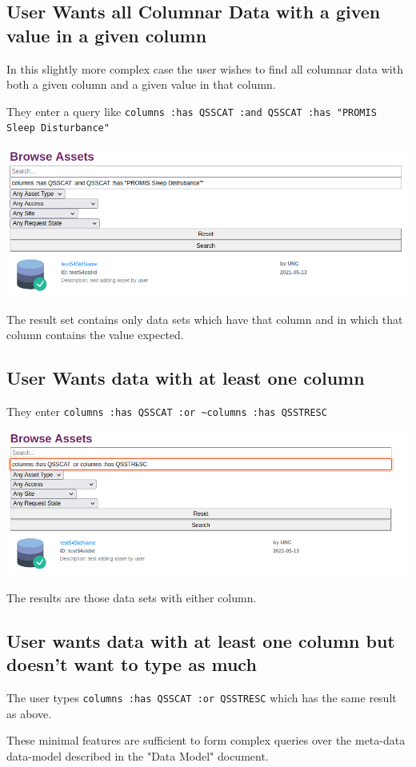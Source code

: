 \documentclass[11pt]{article}
\begin{document}
\subsection{User Wants all Columnar Data with a given value in a given column}
\label{sec:orge70e2aa}

In this slightly more complex case the user wishes to find all
columnar data with both a given column and a given value in that
column.

They enter a query like \texttt{columns :has QSSCAT :and QSSCAT :has "PROMIS
Sleep Disturbance"}

\begin{center}
\includegraphics[width=.9\linewidth]{./query2.png}
\end{center}

The result set contains only data sets which have that column and in
which that column contains the value expected.

\subsection{User Wants data with at least one column}
\label{sec:org95fb4a7}

They enter \texttt{columns :has QSSCAT :or \textasciitilde{}columns :has QSSTRESC}

\begin{center}
\includegraphics[width=.9\linewidth]{./query3.png}
\end{center}

The results are those data sets with either column.

\subsection{User wants data with at least one column but doesn't want to type as much}
\label{sec:org56c4716}

The user types \texttt{columns :has QSSCAT :or QSSTRESC} which has the same
result as above.

These minimal features are sufficient to form complex queries over the
meta-data data-model described in the "Data Model" document.
\end{document}
